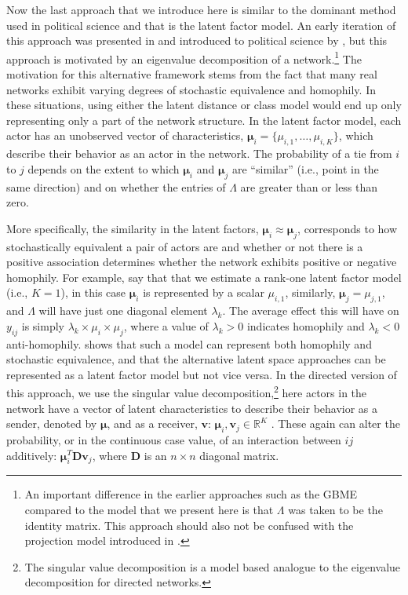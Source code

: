 Now the last approach that we introduce here is similar to the dominant method used in political science and that is the latent factor model. An early iteration of this approach was presented in \citet{hoff:2005} and introduced to political science by \citet{hoff:ward:2004}, but this approach is motivated by an eigenvalue decomposition of a network.\footnote{An important difference in the earlier approaches such as the GBME compared to the model that we present here is that $\Lambda$ was taken to be the identity matrix. This approach should also not be confused with the projection model introduced in \citet{hoff:etal:2002}.} The motivation for this alternative framework stems from the fact that many real networks exhibit varying degrees of stochastic equivalence and homophily. In these situations, using either the latent distance or class model would end up only representing only a part of the network structure. In the latent factor model, each actor has an unobserved vector of characteristics, $\bm\mu_{i} = \{\mu_{i,1}, \ldots, \mu_{i,K} \}$, which describe their behavior as an actor in the network. The probability of a tie from $i$ to $j$ depends on the extent to which $\bm\mu_{i}$ and $\bm\mu_{j}$ are ``similar'' (i.e., point in the same direction) and on whether the entries of $\Lambda$ are greater than or less than zero. 

More specifically, the similarity in the latent factors, $\bm\mu_{i} \approx \bm\mu_{j}$, corresponds to how stochastically equivalent a pair of actors are and whether or not there is a positive association determines whether the network exhibits positive or negative homophily. For example, say that that we estimate a rank-one latent factor model (i.e., $K=1$), in this case $\bm\mu_{i}$ is represented by a scalar $\mu_{i,1}$, similarly, $\bm\mu_{j}=\mu_{j,1}$, and $\Lambda$ will have just one diagonal element $\lambda_{k}$. The average effect this will have on $y_{ij}$ is simply $\lambda_{k} \times \mu_{i} \times \mu_{j}$, where a value of $\lambda_{k}>0$ indicates homophily and $\lambda_{k}<0$ anti-homophily. \citet{hoff:2008} shows that such a model can represent both homophily and stochastic equivalence, and that the alternative latent space approaches can be represented as a latent factor model but not vice versa. In the directed version of this approach, we use the singular value decomposition,\footnote{The singular value decomposition is a model based analogue to the eigenvalue decomposition for directed networks.} here actors in the network have a vector of latent characteristics to describe their behavior as a sender, denoted by $\bm\mu$, and as a receiver, $\textbf{v}$: $\bm\mu_{i}, \textbf{v}_{j} \in \mathbb{R}^{K}$ \citep{hoff:2009}. These again can alter the probability, or in the continuous case value, of an interaction between $ij$ additively: $\bm\mu_{i}^{T} \textbf{D} \textbf{v}_{j}$, where $\textbf{D}$ is an $n \times n$ diagonal matrix. 

